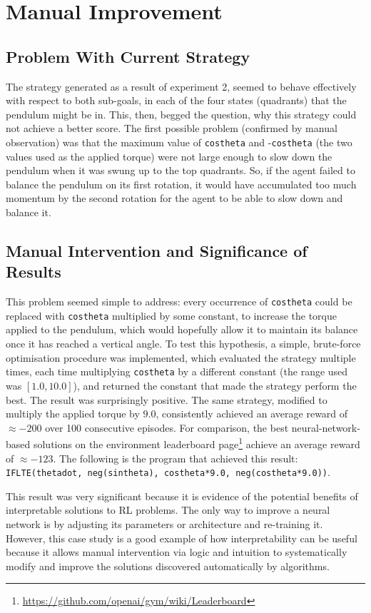 \section{Manual Improvement}
\subsection{Problem With Current Strategy}
The strategy generated as a result of experiment 2, seemed to behave effectively with respect to both sub-goals, in each of the four states (quadrants) that the pendulum might be in. This, then, begged the question, why this strategy could not achieve a better score. The first possible problem (confirmed by manual observation) was that the maximum value of \verb+costheta+ and -\verb+costheta+ (the two values used as the applied torque) were not large enough to slow down the pendulum when it was swung up to the top quadrants. So, if the agent failed to balance the pendulum on its first rotation, it would have accumulated too much momentum by the second rotation for the agent to be able to slow down and balance it. 

\subsection{Manual Intervention and Significance of Results}
This problem seemed simple to address: every occurrence of \verb+costheta+ could be replaced with \verb+costheta+ multiplied by some constant, to increase the torque applied to the pendulum, which would hopefully allow it to maintain its balance once it has reached a vertical angle. To test this hypothesis, a simple, brute-force optimisation procedure was implemented, which evaluated the strategy multiple times, each time multiplying \verb+costheta+ by a different constant (the range used was $[1.0, 10.0]$), and returned the constant that made the strategy perform the best. The result was surprisingly positive. The same strategy, modified to multiply the applied torque by $9.0$, consistently achieved an average reward of $\approx-200$ over 100 consecutive episodes. For comparison, the best neural-network-based solutions on the environment leaderboard page\footnote{\url{https://github.com/openai/gym/wiki/Leaderboard}} achieve an average reward of $\approx-123$. The following is the program that achieved this result: \\\verb+IFLTE(thetadot, neg(sintheta), costheta*9.0, neg(costheta*9.0))+.

This result was very significant because it is evidence of the potential benefits of interpretable solutions to RL problems. The only way to improve a neural network is by adjusting its parameters or architecture and re-training it. However, this case study is a good example of how interpretability can be useful because it allows manual intervention via logic and intuition to systematically modify and improve the solutions discovered automatically by algorithms. 

